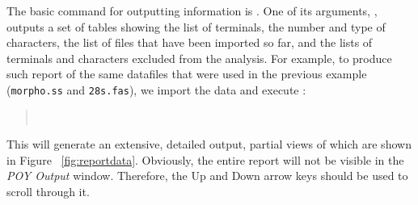 The basic command for outputting information is . One of its arguments, , outputs a set of tables showing the list of terminals, the number and type of characters, the list of files that have been imported so far, and the lists of terminals and characters excluded from the analysis. For example, to produce such report of the same datafiles that were used in the previous example (\texttt{morpho.ss} and \texttt{28s.fas}), we import the data and execute :
\begin{quote}
    \\
\end{quote}
This will generate an extensive, detailed output, partial views of which are shown in Figure ~\ref{fig:reportdata}. Obviously, the entire report will not be visible in the \emph{POY Output} window. Therefore, the Up and Down arrow keys should be used to scroll through it.

